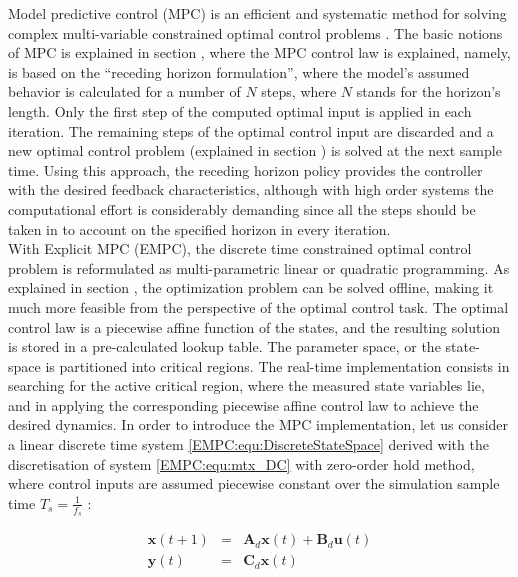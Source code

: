     Model predictive control (MPC) is an efficient and systematic method for solving complex multi-variable constrained optimal control problems \cite{vajda2017limiting}. The basic notions of MPC is explained in section , where the MPC control law is explained, namely, is based on the “receding horizon formulation”, where the model’s assumed behavior is calculated for a number of $N$ steps, where $N$ stands for the horizon’s length. Only the first step of the computed optimal input is applied in each iteration. The remaining steps of the optimal control input are discarded and a new optimal control problem (explained in section ) is solved at the next sample time. Using this approach, the receding horizon policy provides the controller with the desired feedback characteristics, although with high order systems the computational effort is considerably demanding since all the steps should be taken in to account on the specified horizon in every iteration.\\
		With Explicit MPC (EMPC), the discrete time constrained optimal control problem is reformulated as multi-parametric linear or quadratic programming. As explained in section , the optimization problem can be solved offline, making it much more feasible from the perspective of the optimal control task. The optimal control law is a piecewise affine function of the states, and the resulting solution is stored in a pre-calculated lookup table. The parameter space, or the state-space is partitioned into critical regions. The real-time implementation consists in searching for the active critical region, where the measured state variables lie, and in applying the corresponding piecewise affine control law to achieve the desired dynamics.
    In order to introduce the MPC implementation, let us consider a linear discrete time system \ref{EMPC:equ:DiscreteStateSpace} derived with the discretisation of system \ref{EMPC:equ:mtx_DC} with zero-order hold method, where control inputs are assumed piecewise constant over the simulation sample time $T_s=\frac{1}{f_s}$ :

    \begin{equation}
        \begin{array}{rcl}
            \textbf{x}(t+1)&=&\textbf{A}_d\textbf{x}(t)+\textbf{B}_d\textbf{u}(t)\\
            \textbf{y}(t)&=&\textbf{C}_d\textbf{x}(t)
        \end{array}
        \label{EMPC:equ:DiscreteStateSpace}
    \end{equation}


